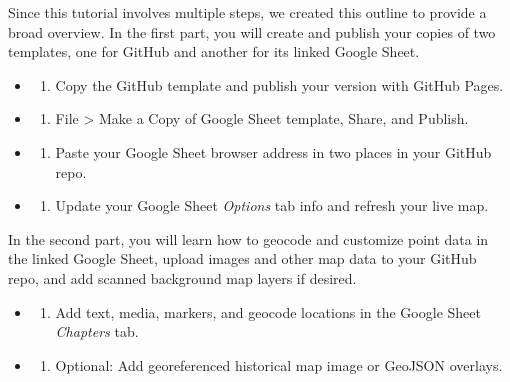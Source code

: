 \documentclass[
  english,
]{book}
\providecommand{\tightlist}{%
  \setlength{\itemsep}{0pt}\setlength{\parskip}{0pt}}
\begin{document}
Since this tutorial involves multiple steps, we created this outline to provide a broad overview. In the first part, you will create and publish your copies of two templates, one for GitHub and another for its linked Google Sheet.

\begin{itemize}
\item
  \begin{enumerate}
  \def\labelenumi{\Alph{enumi})}
  \tightlist
  \item
    Copy the GitHub template and publish your version with GitHub Pages.
  \end{enumerate}
\item
  \begin{enumerate}
  \def\labelenumi{\Alph{enumi})}
  \setcounter{enumi}{1}
  \tightlist
  \item
    File \textgreater{} Make a Copy of Google Sheet template, Share, and Publish.
  \end{enumerate}
\item
  \begin{enumerate}
  \def\labelenumi{\Alph{enumi})}
  \setcounter{enumi}{2}
  \tightlist
  \item
    Paste your Google Sheet browser address in two places in your GitHub repo.
  \end{enumerate}
\item
  \begin{enumerate}
  \def\labelenumi{\Alph{enumi})}
  \setcounter{enumi}{3}
  \tightlist
  \item
    Update your Google Sheet \emph{Options} tab info and refresh your live map.
  \end{enumerate}
\end{itemize}

In the second part, you will learn how to geocode and customize point data in the linked Google Sheet, upload images and other map data to your GitHub repo, and add scanned background map layers if desired.

\begin{itemize}
\item
  \begin{enumerate}
  \def\labelenumi{\Alph{enumi})}
  \setcounter{enumi}{4}
  \tightlist
  \item
    Add text, media, markers, and geocode locations in the Google Sheet \emph{Chapters} tab.
  \end{enumerate}
\item
  \begin{enumerate}
  \def\labelenumi{\Alph{enumi})}
  \setcounter{enumi}{5}
  \tightlist
  \item
    Optional: Add georeferenced historical map image or GeoJSON overlays.
  \end{enumerate}
\end{itemize}
\end{document}
